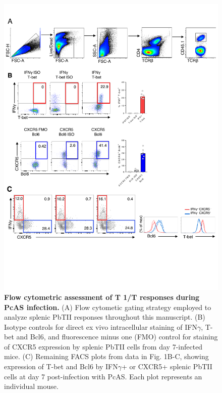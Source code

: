 \begin{figure}
    \centering
    \includegraphics[width=\textwidth]{"Fig S3 rev3"}
    \caption[Flow cytometric assessment of T 1/T responses during PcAS infection]{\textbf{Flow cytometric assessment of T 1/T responses during PcAS infection.} (A) Flow cytometic gating strategy employed to analyze splenic PbTII responses throughout this manuscript. (B) Isotype controls for direct ex vivo intracellular staining of IFN\( \gamma \), T-bet and Bcl6, and fluorescence minus one (FMO) control for staining of CXCR5 expression by splenic PbTII cells from day 7-infected mice. (C) Remaining FACS plots from data in Fig. 1B-C, showing expression of T-bet and Bcl6 by IFN\( \gamma \)+ or CXCR5+ splenic PbTII cells at day 7 post-infection with PcAS. Each plot represents an individual mouse.}
    \label{fig:ms3}
\end{figure}

